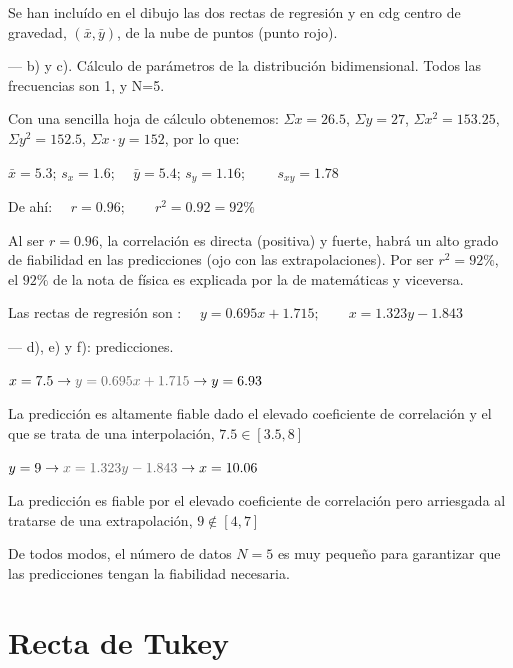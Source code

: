 \begin{ejemplo}
\begin{ejre}
Se han incluído en el dibujo	 las dos rectas de regresión y en cdg centro de gravedad, $(\bar x, \bar y)$, de la nube de puntos (punto rojo).

--- b) y c). Cálculo de parámetros de la distribución bidimensional. Todos las frecuencias son 1, y N=5.

Con una sencilla hoja de cálculo obtenemos: $\Sigma x=26.5$, $\Sigma y=27$, $\Sigma x^2=153.25$, $\Sigma y^2=152.5$, $\Sigma x\cdot y=152$, por lo que:

$\bar x=5.3$; $s_x=1.6$; $\quad \bar y=5.4$; $s_y=1.16$; $\qquad s_{xy}=1.78$

De ahí: $\quad r=0.96; \qquad r^2=0.92=92\%$

Al ser $r=0.96$, la correlación es directa (positiva) y fuerte, habrá un alto grado de fiabilidad en las predicciones (ojo con las extrapolaciones). Por ser $r^2=92\%$, el $92\%$ de la nota de física es explicada por la de matemáticas y viceversa.

Las rectas de regresión son : $\quad y=0.695x+1.715; \qquad x=1.323y-1.843$

--- d), e) y f): predicciones.

$x=7.5 \to \textcolor{gris}{y=0.695x+1.715} \to y=6.93$

La predicción es altamente fiable dado el elevado coeficiente de correlación y el que se trata de una interpolación, $7.5\in [3.5,8]$

$y=9 \to \textcolor{gris}{x=1.323y-1.843} \to x=10.06$

La predicción es fiable por el elevado coeficiente de correlación pero arriesgada al tratarse de una extrapolación, $9\notin [4,7]$

\vspace{4mm} \textsf{De todos modos, el número de datos $N=5$ es muy pequeño para garantizar que las predicciones  tengan la fiabilidad necesaria.}
\end{ejre}	
\end{ejemplo}


\section{Recta de Tukey}

